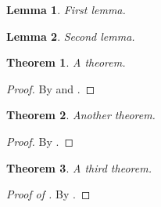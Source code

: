 \documentclass{article}
\newtheorem{theorem}{Theorem}
\newtheorem{lemma}{Lemma}
\begin{document}
\begin{lemma}\label{l1}First lemma.\end{lemma}
\begin{lemma}\label{l2}Second lemma.\end{lemma}
\begin{theorem}\label{t1}A theorem.\end{theorem}
\begin{proof}By  and .\end{proof}
\begin{theorem}\label{t2}Another theorem.\end{theorem}
\begin{proof}By .\end{proof}
\begin{theorem}\label{t3}A third theorem.\end{theorem}
\begin{proof}[Proof of ]By .\end{proof}
\end{document}
